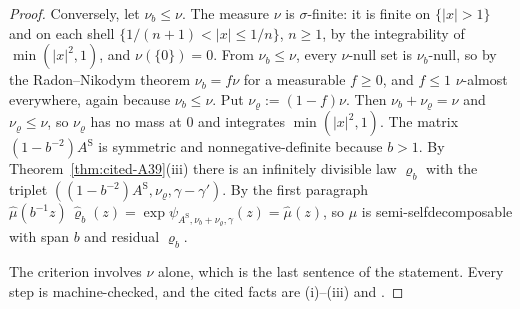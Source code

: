 \begin{proof}
Conversely, let $\nu_b \le \nu$. The measure $\nu$ is $\sigma$-finite: it is finite on
$\{|x| > 1\}$ and on each shell $\{1/(n+1) < |x| \le 1/n\}$, $n \ge 1$, by the integrability of
$\min(|x|^2, 1)$, and $\nu(\{0\}) = 0$. From $\nu_b \le \nu$, every $\nu$-null set is
$\nu_b$-null, so by the Radon--Nikodym theorem $\nu_b = f\nu$ for a measurable $f \ge 0$, and
$f \le 1$ $\nu$-almost everywhere, again because $\nu_b \le \nu$. Put $\nu_\varrho := (1 - f)\nu$.
Then $\nu_b + \nu_\varrho = \nu$ and $\nu_\varrho \le \nu$, so $\nu_\varrho$ has no mass at $0$ and
integrates $\min(|x|^2, 1)$. The matrix
$(1 - b^{-2})A^{\mathrm S}$ is symmetric and nonnegative-definite because $b > 1$. By
Theorem~\ref{thm:cited-A39}(iii) there is an infinitely divisible law $\varrho_b$ with the triplet
$((1 - b^{-2})A^{\mathrm S}, \nu_\varrho, \gamma - \gamma')$. By the first paragraph
$\widehat\mu(b^{-1}z)\,\widehat\varrho_b(z) = \exp\psi_{A^{\mathrm S},\nu_b + \nu_\varrho,\gamma}(z) =
\widehat\mu(z)$, so $\mu$ is semi-selfdecomposable with span $b$ and residual $\varrho_b$.

The criterion involves $\nu$ alone, which is the last sentence of the statement. Every step is
machine-checked, and the cited facts are (i)--(iii) and .
\end{proof}

